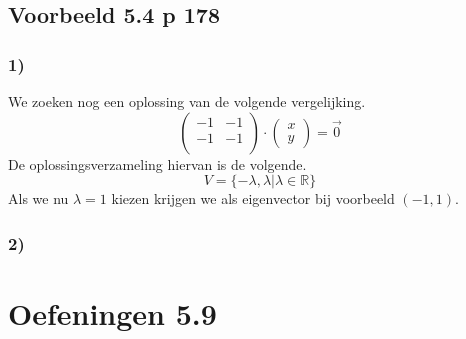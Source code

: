 \documentclass[lineaire_algebra_oplossingen.tex]{subfiles}
\begin{document}
\subsection{Voorbeeld 5.4 p 178}
\subsubsection*{1)}
We zoeken nog een oplossing van de volgende vergelijking.
\[
\begin{pmatrix}
-1 & -1\\
-1 & -1\\
\end{pmatrix}
\cdot
\begin{pmatrix}
x\\y
\end{pmatrix}
=
\vec{0}
\]
De oplossingsverzameling hiervan is de volgende.
\[
V = \{-\lambda,\lambda|\lambda\in\mathbb{R}\}
\]
Als we nu $\lambda = 1$ kiezen krijgen we als eigenvector bij voorbeeld $(-1,1)$.

\subsubsection*{2)}

\section{Oefeningen 5.9}
\end{document}
